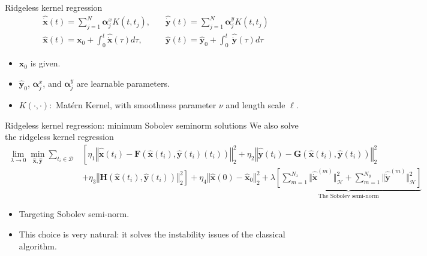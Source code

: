 \documentclass[aspectratio=169,10pt]{beamer}
\begin{document}
\begin{frame}{Ridgeless kernel regression}
\begin{align*}
	\hat{\dot{\mathbf{x}}}(t) = \sum_{j=1}^{N} \boldsymbol{\alpha}^x_j K(t,t_j), &\quad \hat{\dot{\mathbf{y}}}(t) = \sum_{j=1}^{N} \boldsymbol{\alpha}^y_jK(t,t_j)\\
	\hat{\mathbf{x}}(t) = \mathbf{x}_0+ \int_0^t \hat{\dot{\mathbf{x}}}(\tau) d\tau, &\quad \hat{\mathbf{y}}(t) = \hat{\mathbf{y}}_0+ \int_0^t \ \hat{\dot{\mathbf{y}}}(\tau) d\tau 
\end{align*}
\begin{itemize}
	\item  $\mathbf{x}_0$ is given.
	\vspace{0.1in}
	\item $\hat{\mathbf{y}}_0$, $\boldsymbol{\alpha}^x_j$, and $\boldsymbol{\alpha}^y_j$ are learnable parameters. 
	\vspace{0.1in}
	\item $K(\cdot,\cdot):$ Matérn Kernel, with smoothness parameter $\nu$ and length scale $\ell$.
\end{itemize}
\end{frame}

\begin{frame}{Ridgeless kernel regression: minimum Sobolev seminorm solutions}
We also solve the ridgeless kernel regression 
\begin{align*}
	\lim_{\lambda\rightarrow 0} \min_{\hat{\mathbf{x}}, \hat{\mathbf{y}}} \sum_{t_i \in \mathcal{D}} &\left[\eta_1 \left\Vert \hat{\dot{\mathbf{x}}}(t_i) 
	- \mathbf{F}(\hat{\mathbf{x}}(t_i), \hat{\mathbf{y}}(t_i)(t_i)) \right\Vert_2^2 + \eta_2 \left\Vert \hat{\dot{\mathbf{y}}}(t_i) -  \mathbf{G}(\hat{\mathbf{x}}(t_i), \hat{\mathbf{y}}(t_i)) \right\Vert_2^2\right.\nonumber\\
	&\left.+ \eta_3 \left\Vert \mathbf{H}(\hat{\mathbf{x}}(t_i), \hat{\mathbf{y}}(t_i)) \right\Vert_2^2 \right] + \eta_4 \left\Vert \hat{\mathbf{x}}(0) - \hat{\mathbf{x}}_0 \right\Vert_2^2 + \lambda \underbrace{\left[\sum_{m=1}^{N_x}\Vert \hat{\dot{\mathbf{x}}}^{(m)}\Vert^2_{\mathcal{H}}+ \sum_{m=1}^{N_y}\Vert \hat{\dot{\mathbf{y}}}^{(m)}\Vert^2_{\mathcal{H}}\right]}_{\text{The Sobolev semi-norm}}
\end{align*}
\begin{itemize}
	\item Targeting Sobolev semi-norm.
	\vspace{0.1in}
	\item This choice is very natural: it solves the instability issues of the classical algorithm.
\end{itemize} 
\end{frame}
\end{document}
